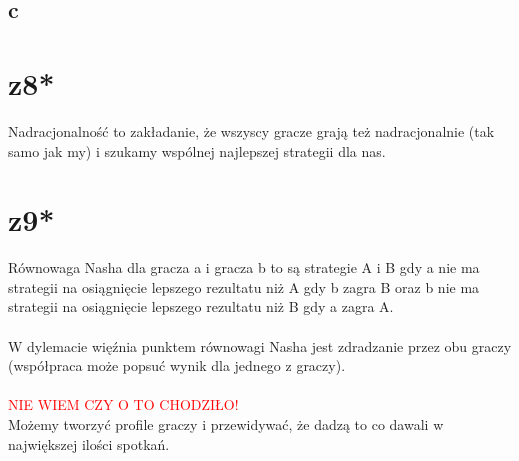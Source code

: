 \documentclass{article}
\begin{document}
\subsection*{c}
\section{z8*}
Nadracjonalność to zakładanie, że wszyscy gracze grają też nadracjonalnie (tak samo jak my) i szukamy wspólnej najlepszej strategii dla nas.
\section{z9*}
Równowaga Nasha dla gracza a i gracza b to są strategie A i B gdy a nie ma strategii na osiągnięcie lepszego rezultatu niż A gdy b zagra B oraz b nie ma strategii na osiągnięcie lepszego rezultatu niż B gdy a zagra A.\\\\
W dylemacie więźnia punktem równowagi Nasha jest zdradzanie przez obu graczy (współpraca może popsuć wynik dla jednego z graczy).\\\\
\textcolor{red}{NIE WIEM CZY O TO CHODZIŁO!}\\
Możemy tworzyć profile graczy i przewidywać, że dadzą to co dawali w największej ilości spotkań.
\end{document}
